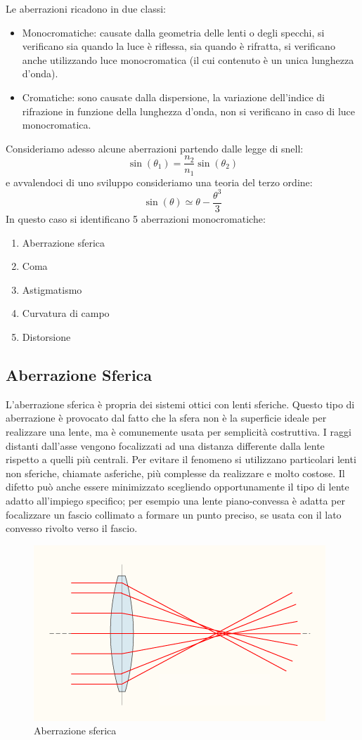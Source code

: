 Le aberrazioni ricadono in due classi:
\begin{itemize}
	\item Monocromatiche: causate dalla geometria delle lenti o degli specchi, si verificano sia quando la luce è riflessa, sia quando è rifratta, si verificano anche utilizzando luce monocromatica (il cui contenuto è un unica lunghezza d'onda).
	\item Cromatiche: sono causate dalla dispersione, la variazione dell'indice di rifrazione in funzione della lunghezza d'onda, non si verificano in caso di luce monocromatica.
\end{itemize}
Consideriamo adesso alcune aberrazioni partendo dalle legge di snell:
\[\sin(\theta_1)=\frac{n_2}{n_1 } \sin(\theta_2)\]
e avvalendoci di uno sviluppo consideriamo una teoria del terzo ordine:
\[\sin(\theta) \simeq \theta - \frac{\theta^3}{3}\]
In questo caso si identificano 5 aberrazioni monocromatiche:
\begin{enumerate}
\item Aberrazione sferica
\item Coma
\item Astigmatismo
\item Curvatura di campo
\item Distorsione
\end{enumerate}

\subsection{Aberrazione Sferica} 

L'aberrazione sferica è propria dei sistemi ottici con lenti sferiche. Questo
tipo di aberrazione è provocato dal fatto che la sfera non è la superficie
ideale per realizzare una lente, ma è comunemente usata per semplicità
costruttiva. I raggi distanti dall'asse vengono focalizzati ad una distanza
differente dalla lente rispetto a quelli più centrali. Per evitare il fenomeno
si utilizzano particolari lenti non sferiche, chiamate asferiche, più
complesse da realizzare e molto costose. Il difetto può anche essere
minimizzato scegliendo opportunamente il tipo di lente adatto all'impiego
specifico; per esempio una lente piano-convessa è adatta per focalizzare un
fascio collimato a formare un punto preciso, se usata con il lato convesso
rivolto verso il fascio.

\begin{figure}

\centering
\includegraphics[width=.5\textwidth]{img/aberrazione-sferica.png}

\caption{Aberrazione sferica}
\label{fig:astigmatismo}
\end{figure}

